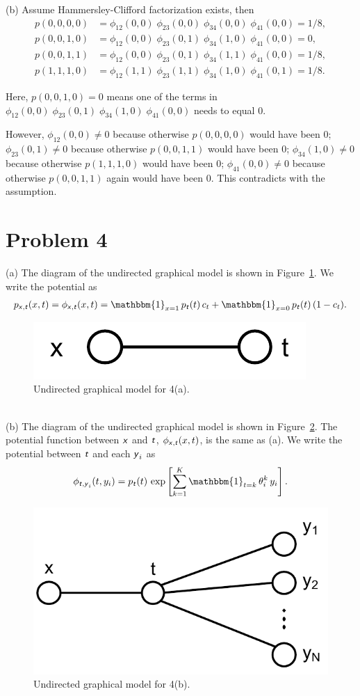 \documentclass{article}
\newcommand{\s}[1]{\textsf{\textit{#1}}}
\newcommand{\qeds}{\hfill\qedsymbol}
\begin{document}
%
\noindent
(b) Assume Hammersley-Clifford factorization exists, then
\begin{align*}
p(0, 0, 0, 0) &= \phi_{12}(0,0)\;\phi_{23}(0,0)\;\phi_{34}(0,0)\;\phi_{41}(0,0)=1/8,\\
p(0, 0, 1, 0) &= \phi_{12}(0,0)\;\phi_{23}(0,1)\;\phi_{34}(1,0)\;\phi_{41}(0,0)=0,\\
p(0, 0, 1, 1) &= \phi_{12}(0,0)\;\phi_{23}(0,1)\;\phi_{34}(1,1)\;\phi_{41}(0,0)=1/8,\\
p(1, 1, 1, 0) &= \phi_{12}(1,1)\;\phi_{23}(1,1)\;\phi_{34}(1,0)\;\phi_{41}(0,1)=1/8.
\end{align*}

Here, $p(0, 0, 1, 0) = 0$ means one of the terms in $\phi_{12}(0,0)\;\phi_{23}(0,1)\;\phi_{34}(1,0)\;\phi_{41}(0,0)$ needs to equal $0$.

However,
$\phi_{12}(0,0) \neq 0$ because otherwise $p(0, 0, 0, 0)$ would have been $0$;
$\phi_{23}(0,1) \neq 0$ because otherwise $p(0, 0, 1, 1)$ would have been $0$;
$\phi_{34}(1,0) \neq 0$ because otherwise $p(1, 1, 1, 0)$ would have been $0$;
$\phi_{41}(0,0) \neq 0$ because otherwise $p(0, 0, 1, 1)$ again would have been $0$.
This contradicts with the assumption. \qeds
\pagebreak


\section*{Problem 4}
(a) The diagram of the undirected graphical model is shown in Figure~\ref{f:4a}.
We write the potential as
\begin{align*}
p_{\s{x}, \s{t}}(x, t) = \phi_{\s{x}, \s{t}}(x, t) = \mathbbm{1}_{x=1}\,p_{\s{t}}(t)\,c_t + \mathbbm{1}_{x=0}\,p_{\s{t}}(t)\,(1 - c_t).
\end{align*}
\begin{figure}[h]
  \centering
  \includegraphics[width=0.2\columnwidth]{4a.pdf}
  \caption{Undirected graphical model for 4(a).}
  \label{f:4a}
\end{figure}
\\

%
\noindent
(b) The diagram of the undirected graphical model is shown in Figure~\ref{f:4b}.
The potential function between $\s{x}$ and $\s{t}$, $\phi_{\s{x}, \s{t}}(x, t)$,
is the same as (a).
We write the potential between $\s{t}$ and each $\s{y}_i$ as
\begin{align*}
\phi_{\s{t}, \s{y}_i}(t, y_i) = p_{\s{t}}(t)\,\exp\left[\sum_{k=1}^K\mathbbm{1}_{t=k}\,\theta_i^k\,y_i\right].
\end{align*}

\begin{figure}[h]
  \centering
  \includegraphics[width=0.3\columnwidth]{4b.pdf}
  \caption{Undirected graphical model for 4(b).}
  \label{f:4b}
\end{figure}
\end{document}
